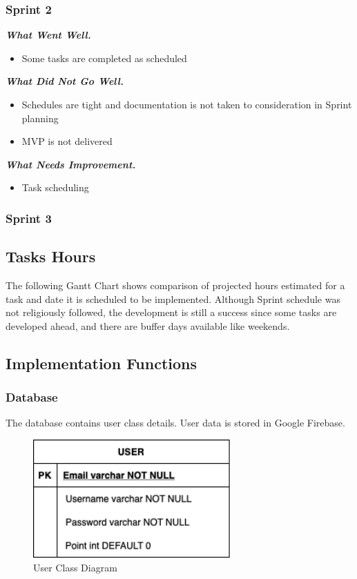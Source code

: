\documentclass{article}
\begin{document}
    \subsubsection{Sprint 2}
        \textbf{\emph{What Went Well.}}
        \begin{itemize}
            \item Some tasks are completed as scheduled
        \end{itemize}
        \textbf{\emph{What Did Not Go Well.}}
        \begin{itemize}
            \item Schedules are tight and documentation is not taken to consideration in Sprint planning
            \item MVP is not delivered
        \end{itemize}
        \textbf{\emph{What Needs Improvement.}}
            \begin{itemize}
                \item Task scheduling
            \end{itemize}
    \subsubsection{Sprint 3}
\subsection{Tasks Hours}
The following Gantt Chart shows comparison of projected hours estimated for a task and date it is scheduled to be implemented.  Although Sprint schedule was not religiously followed, the development is still a success since some tasks are developed ahead, and there are buffer days available like weekends.  
\newpage
\subsection{Implementation Functions}
    \subsubsection{Database}
    The database contains user class details.  User data is stored in Google Firebase.
        \begin{figure}[h]
            \centering
            \includegraphics[width=3in]{images/TTRT.png}
        \caption{User Class Diagram}
        \end{figure}
        \newpage   
\end{document}
